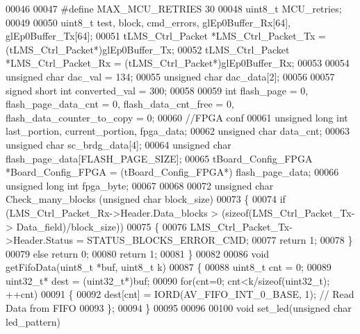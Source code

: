 \begin{DoxyCode}
00046 
00047 \textcolor{preprocessor}{#define MAX\_MCU\_RETRIES 30}
00048 uint8\_t MCU_retries;
00049 
00050 uint8\_t test, block, cmd_errors, glEp0Buffer_Rx[64], glEp0Buffer_Tx[64];
00051 tLMS_Ctrl_Packet *LMS_Ctrl_Packet_Tx = (tLMS_Ctrl_Packet*)glEp0Buffer_Tx;
00052 tLMS_Ctrl_Packet *LMS_Ctrl_Packet_Rx = (tLMS_Ctrl_Packet*)glEp0Buffer_Rx;
00053 
00054 \textcolor{keywordtype}{unsigned} \textcolor{keywordtype}{char} dac_val = 134;
00055 \textcolor{keywordtype}{unsigned} \textcolor{keywordtype}{char} dac_data[2];
00056 
00057 \textcolor{keywordtype}{signed} \textcolor{keywordtype}{short} \textcolor{keywordtype}{int} converted_val = 300;
00058 
00059 \textcolor{keywordtype}{int} flash_page = 0, flash_page_data_cnt = 0, flash_data_cnt_free = 0, 
      flash_data_counter_to_copy = 0;
00060 \textcolor{comment}{//FPGA conf}
00061 \textcolor{keywordtype}{unsigned} \textcolor{keywordtype}{long} \textcolor{keywordtype}{int} last_portion, current_portion, fpga_data;
00062 \textcolor{keywordtype}{unsigned} \textcolor{keywordtype}{char} data_cnt;
00063 \textcolor{keywordtype}{unsigned} \textcolor{keywordtype}{char} sc_brdg_data[4];
00064 \textcolor{keywordtype}{unsigned} \textcolor{keywordtype}{char} flash_page_data[FLASH_PAGE_SIZE];
00065 tBoard_Config_FPGA *Board_Config_FPGA = (tBoard_Config_FPGA*) flash_page_data;
00066 \textcolor{keywordtype}{unsigned} \textcolor{keywordtype}{long} \textcolor{keywordtype}{int} fpga_byte;
00067 
00068 
00072 \textcolor{keywordtype}{unsigned} \textcolor{keywordtype}{char} Check_many_blocks (\textcolor{keywordtype}{unsigned} \textcolor{keywordtype}{char} block\_size)
00073 \{
00074     \textcolor{keywordflow}{if} (LMS\_Ctrl\_Packet\_Rx->Header.Data_blocks > (\textcolor{keyword}{sizeof}(LMS\_Ctrl\_Packet\_Tx->
      Data_field)/block\_size))
00075     \{
00076         LMS\_Ctrl\_Packet\_Tx->Header.Status = STATUS_BLOCKS_ERROR_CMD;
00077         \textcolor{keywordflow}{return} 1;
00078     \}
00079     \textcolor{keywordflow}{else} \textcolor{keywordflow}{return} 0;
00080     \textcolor{keywordflow}{return} 1;
00081 \}
00082 
00086 \textcolor{keywordtype}{void} getFifoData(uint8\_t *buf, uint8\_t k)
00087 \{
00088     uint8\_t cnt = 0;
00089     uint32\_t* dest = (uint32\_t*)buf;
00090     \textcolor{keywordflow}{for}(cnt=0; cnt<k/\textcolor{keyword}{sizeof}(uint32\_t); ++cnt)
00091     \{
00092         dest[cnt] = IORD(AV_FIFO_INT_0_BASE, 1);    \textcolor{comment}{// Read Data from FIFO}
00093     \};
00094 \}
00095 
00096 
00100 \textcolor{keywordtype}{void} set_led(\textcolor{keywordtype}{unsigned} \textcolor{keywordtype}{char} led\_pattern)

\end{DoxyCode}
